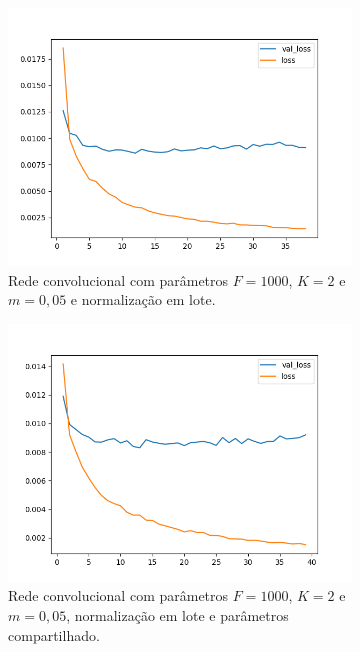 \begin{figure}[H]
\begin{subfigure}{.5\textwidth}
  \centering
  \includegraphics[width=.8\linewidth]{figuras/ape-ajustes-hiper-parametros/cnn-with-bn-1000-k-2-m-005.png}
  \caption{Rede convolucional com parâmetros $F = 1000$, $K = 2$ e $m = 0,05$ e normalização em lote.}
  \label{fig:cnn-1000-k-2-m-005-normalizacao-em-lote-v2}
\end{subfigure}
\begin{subfigure}{.5\textwidth}
  \centering
  \includegraphics[width=.8\linewidth]{figuras/ape-ajustes-hiper-parametros/shared-cnn-with-bn-1000-k-2-m-005.png}
  \caption{Rede convolucional com parâmetros $F = 1000$, $K = 2$ e $m = 0,05$, normalização em lote e parâmetros compartilhado.}
  \label{fig:shared-cnn-1000-k-2-m-005-normalizacao-em-lote}
\end{subfigure}
\begin{subfigure}{.5\textwidth}
  \centering

\end{subfigure}
\end{figure}

